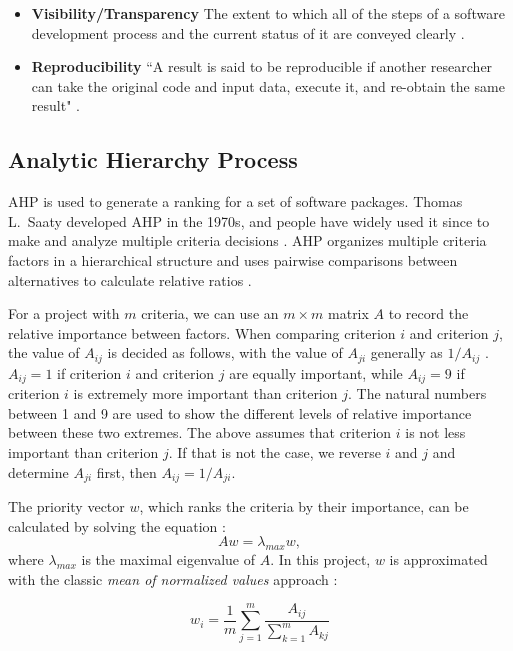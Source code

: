 \documentclass[final, 3p, times, authoryear]{elsarticle}
\begin{document}
\begin{itemize}
	\item \textbf{Visibility/Transparency} The extent to which all of the steps
	of a software development process and the current status of it are conveyed
	clearly \citep{ghezzi1991fundamentals}.

	\item \textbf{Reproducibility} ``A result is said to be reproducible if
	another researcher can take the original code and input data, execute it,
	and re-obtain the same result" \citep{BenureauAndRougier2017}.
\end{itemize}

\subsection{Analytic Hierarchy Process} \label{sec_AHP}

AHP is used to generate a ranking for a set of software packages. Thomas L.\
Saaty developed AHP in the 1970s, and people have widely used it since to make
and analyze multiple criteria decisions \citep{VaidyaEtAl2006}. AHP organizes
multiple criteria factors in a hierarchical structure and uses pairwise
comparisons between alternatives to calculate relative ratios \citep{Saaty1990}.

For a project with $m$ criteria, we can use an $m\times m$ matrix $A$ to record
the relative importance between factors. When comparing criterion $i$ and
criterion $j$, the value of $A_{ij}$ is decided as follows, with the value of
$A_{ji}$ generally as $1/A_{ij}$ \citep{Saaty1990}.  $A_{ij} = 1$ if criterion
$i$ and criterion $j$ are equally important, while $A_{ij} = 9$ if criterion $i$
is extremely more important than criterion $j$.  The natural numbers between 1
and 9 are used to show the different levels of relative importance between these
two extremes. The above assumes that criterion $i$ is not less important than
criterion $j$.  If that is not the case, we reverse $i$ and $j$ and determine
$A_{ji}$ first, then $A_{ij} = 1/A_{ji}$.

The priority vector $w$, which ranks the criteria by their importance, can be
calculated by solving the equation \citep{Saaty1990}:
\begin{equation} 
    A w = \lambda_{max} w,
\end{equation}
where $\lambda_{max}$ is the maximal eigenvalue of $A$.  In this project, $w$ is
approximated with the classic \textit{mean of normalized values} approach
\citep{AlessioEtAl2006}:

\begin{equation}
w_i = \frac{1}{m}\sum_{j=1}^{m}\frac{A_{ij}}{\sum_{k=1}^{m}A_{kj}}
\end{equation}
\end{document}
